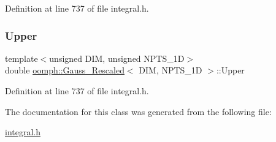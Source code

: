 Definition at line 737 of file integral.\+h.

\mbox{\label{classoomph_1_1Gauss__Rescaled_aca2fff700e5ffabad7c8ed9368f84b6e}} 
\subsubsection{\texorpdfstring{Upper}{Upper}}
{\footnotesize\ttfamily template$<$unsigned D\+IM, unsigned N\+P\+T\+S\+\_\+1D$>$ \\
double \hyperlink{classoomph_1_1Gauss__Rescaled}{oomph\+::\+Gauss\+\_\+\+Rescaled}$<$ D\+IM, N\+P\+T\+S\+\_\+1D $>$\+::Upper\hspace{0.3cm}{\ttfamily [private]}}



Definition at line 737 of file integral.\+h.



The documentation for this class was generated from the following file\+:\begin{DoxyCompactItemize}
\item 
\hyperlink{integral_8h}{integral.\+h}\end{DoxyCompactItemize}
